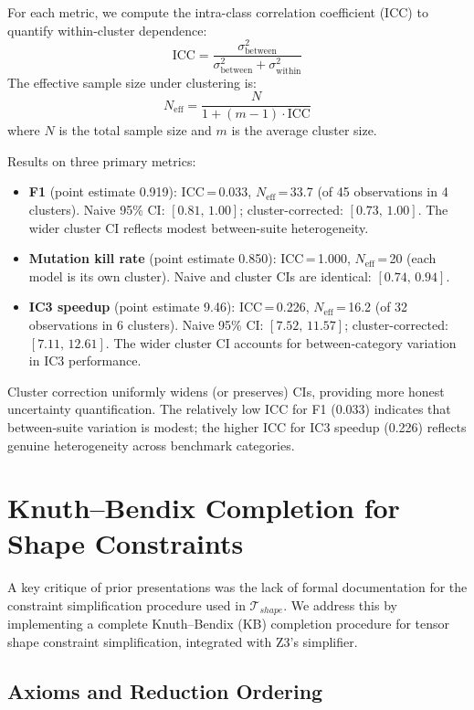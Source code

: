 \documentclass[11pt]{article}
\begin{document}
For each metric, we compute the intra-class correlation coefficient
(ICC) to quantify within-cluster dependence:
\[
  \text{ICC} = \frac{\sigma^2_{\text{between}}}
    {\sigma^2_{\text{between}} + \sigma^2_{\text{within}}}
\]
The effective sample size under clustering is:
\[
  N_{\text{eff}} = \frac{N}{1 + (m - 1) \cdot \text{ICC}}
\]
where $N$ is the total sample size and $m$ is the average cluster size.

Results on three primary metrics:
\begin{itemize}[leftmargin=2em,nosep]
  \item \textbf{F1} (point estimate 0.919):
    ICC\,=\,0.033, $N_{\text{eff}}$\,=\,33.7 (of 45 observations
    in 4 clusters).
    Naive 95\% CI: $[0.81,\, 1.00]$;
    cluster-corrected: $[0.73,\, 1.00]$.
    The wider cluster CI reflects modest between-suite heterogeneity.
  \item \textbf{Mutation kill rate} (point estimate 0.850):
    ICC\,=\,1.000, $N_{\text{eff}}$\,=\,20 (each model is its own
    cluster).  Naive and cluster CIs are identical: $[0.74,\, 0.94]$.
  \item \textbf{IC3 speedup} (point estimate 9.46):
    ICC\,=\,0.226, $N_{\text{eff}}$\,=\,16.2 (of 32 observations
    in 6 clusters).
    Naive 95\% CI: $[7.52,\, 11.57]$;
    cluster-corrected: $[7.11,\, 12.61]$.
    The wider cluster CI accounts for between-category variation
    in IC3 performance.
\end{itemize}
Cluster correction uniformly widens (or preserves) CIs, providing
more honest uncertainty quantification.  The relatively low ICC
for F1 (0.033) indicates that between-suite variation is modest;
the higher ICC for IC3 speedup (0.226) reflects genuine
heterogeneity across benchmark categories.


\section{Knuth--Bendix Completion for Shape Constraints}\label{app:knuth-bendix}

A key critique of prior presentations was the lack of formal
documentation for the constraint simplification procedure used
in $\mathcal{T}_{\mathit{shape}}$.  We address this by implementing
a complete Knuth--Bendix (KB) completion procedure for tensor shape
constraint simplification, integrated with Z3's simplifier.

\subsection{Axioms and Reduction Ordering}
\end{document}
